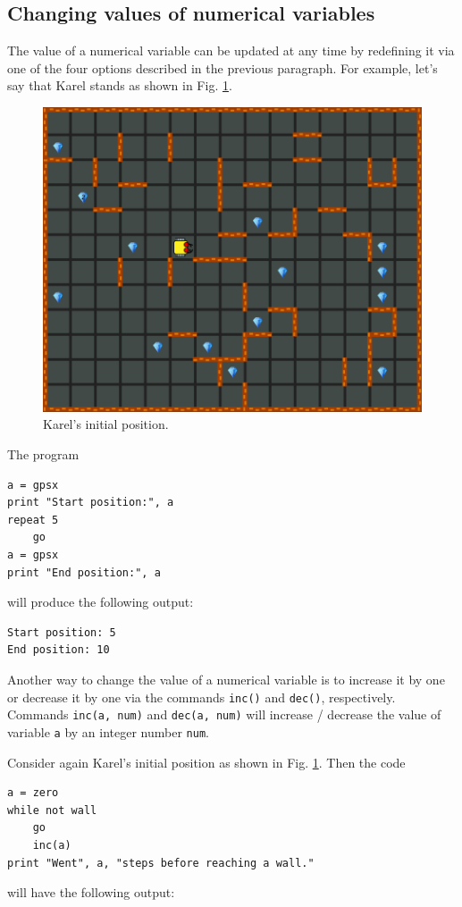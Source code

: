 {{{{\subsection{Changing values of numerical variables}

The value of a numerical variable can be updated at any time by redefining it via 
one of the four options described in the previous paragraph. For example, let's say that 
Karel stands as shown in Fig. \ref{fig:var1}.
\begin{figure}[!ht]
\begin{center}
\includegraphics[height=0.4\textwidth]{imgk/variables1.png}
\end{center}
\vspace{-4mm}
\caption{Karel's initial position.}
\label{fig:var1}
\end{figure}
\noindent
The program

\begin{verbatim}
a = gpsx
print "Start position:", a
repeat 5
    go
a = gpsx 
print "End position:", a
\end{verbatim}
will produce the following output:

\begin{verbatim}
Start position: 5
End position: 10
\end{verbatim}
Another way to change the value of a numerical variable is to increase it by one or 
decrease it by one via the commands {\tt inc()} and 
{\tt dec()}, respectively. Commands {\tt inc(a, num)} and 
{\tt dec(a, num)} will increase / decrease the value of variable {\tt a}
by an integer number {\tt num}.

Consider again Karel's initial position as shown 
in Fig. \ref{fig:var1}. Then the code

\begin{verbatim}
a = zero
while not wall
    go
    inc(a)
print "Went", a, "steps before reaching a wall."
\end{verbatim}
will have the following output:

}}}}
